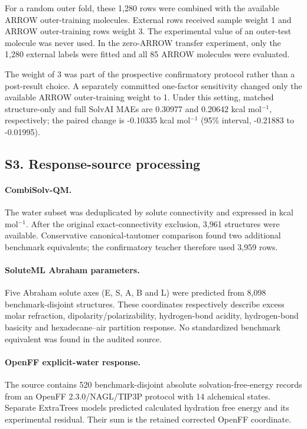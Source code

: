 \documentclass[10pt]{article}
\begin{document}
For a random outer fold, these 1,280 rows were combined with the available ARROW
outer-training molecules. External rows received sample weight 1 and ARROW
outer-training rows weight 3. The experimental value of an outer-test molecule was
never used. In the zero-ARROW transfer experiment, only the 1,280 external labels
were fitted and all 85 ARROW molecules were evaluated.

The weight of 3 was part of the prospective confirmatory protocol rather than a
post-result choice. A separately committed one-factor sensitivity changed only the
available ARROW outer-training weight to 1. Under this setting, matched structure-only
and full SolvAI MAEs are 0.30977 and 0.20642 kcal mol$^{-1}$, respectively; the paired
change is -0.10335 kcal mol$^{-1}$ (95\% interval, -0.21883 to -0.01995).

\subsection*{S3. Response-source processing}

\paragraph{CombiSolv-QM.}
The water subset was deduplicated by solute connectivity and expressed in kcal
mol$^{-1}$. After the original exact-connectivity exclusion, 3,961 structures were
available. Conservative canonical-tautomer comparison found two additional
benchmark equivalents; the confirmatory teacher therefore used 3,959 rows.

\paragraph{SoluteML Abraham parameters.}
Five Abraham solute axes (E, S, A, B and L) were predicted from 8,098
benchmark-disjoint structures. These coordinates respectively describe excess molar
refraction, dipolarity/polarizability, hydrogen-bond acidity, hydrogen-bond basicity
and hexadecane--air partition response. No standardized benchmark equivalent was
found in the audited source.

\paragraph{OpenFF explicit-water response.}
The source contains 520 benchmark-disjoint absolute solvation-free-energy records
from an OpenFF 2.3.0/NAGL/TIP3P protocol with 14 alchemical states. Separate
ExtraTrees models predicted calculated hydration free energy and its experimental
residual. Their sum is the retained corrected OpenFF coordinate.
\end{document}

